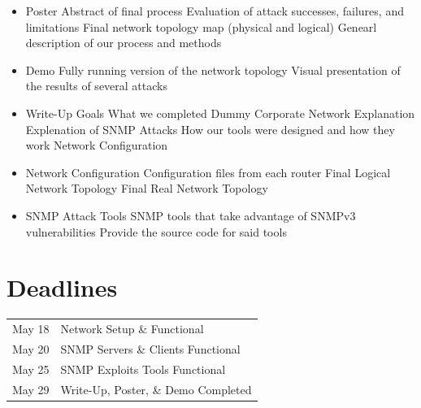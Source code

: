 \documentclass[pdftex, 11pt]{article}
\begin{document}
\begin{itemize}
\item Poster
  \subitem Abstract of final process
  \subitem Evaluation of attack successes, failures, and limitations
  \subitem Final network topology map (physical and logical)
  \subitem Genearl description of our process and methods

\item Demo
  \subitem Fully running version of the network topology %
  \subitem Visual presentation of the results of several attacks

\item Write-Up
  \subitem Goals
  \subitem What we completed
  \subitem Dummy Corporate Network Explanation
  \subitem Explenation of SNMP Attacks
  \subitem How our tools were designed and how they work
  \subitem Network Configuration

\item Network Configuration
  \subitem Configuration files from each router
  \subitem Final Logical Network Topology
  \subitem Final Real Network Topology

\item SNMP Attack Tools
  \subitem SNMP tools that take advantage of SNMPv3  vulnerabilities
  \subitem Provide the source code for said tools

\end{itemize}

\section{Deadlines}

\begin{center}
\begin{tabular}{l l}
  May 18 & Network Setup \& Functional \\
  May 20 & SNMP Servers \& Clients Functional \\
  May 25 & SNMP Exploits Tools Functional \\
  May 29 & Write-Up, Poster, \& Demo Completed \\
\end{tabular}
\end{center}
\end{document}
